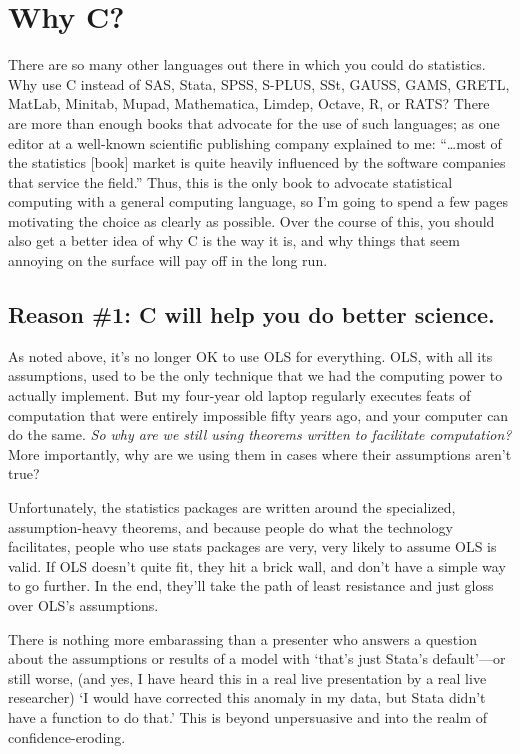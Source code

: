 \section{Why C?}

There are so many other languages out there in which you could do
statistics. Why use C instead of SAS, Stata, SPSS, S-PLUS, SSt, GAUSS, GAMS, GRETL,
MatLab, Minitab, Mupad, Mathematica, Limdep, Octave, R, or RATS? 
There are more than enough books that advocate for the use of such
languages; 
as one editor at a well-known scientific publishing company
explained to me: ``\dots most of the statistics [book] market is quite heavily
influenced by the software companies that service the
field.''  Thus, this is the only book to advocate statistical computing
with a general computing language, so I'm going to spend a few pages
motivating the choice as clearly as possible. Over the course of this, you should
also get a better idea of why C is the way it is, and why things that
seem annoying on the surface will pay off in the long run.
\ifbook
\subsection{Reason \#1: C will help you do better science.}
As noted above, it's no longer OK to use OLS for everything.
OLS, with all its assumptions, used to be the only technique that we had the computing
power to actually implement. But my four-year old laptop regularly executes
feats of computation that were entirely impossible fifty years ago, and your
computer can do the same.  {\it So why are
we still using theorems written to facilitate computation?} More importantly, why
are we using them in cases where their assumptions aren't true?

Unfortunately, the statistics packages are written around the
specialized, assumption-heavy theorems, and because people do what the
technology facilitates, people who use stats packages are very, very
likely to assume OLS is valid.  If OLS doesn't quite fit, they hit a
brick wall, and don't have a simple way to go further. In the end, they'll
take the path of least resistance and just gloss over OLS's assumptions.

There is nothing more embarassing than a presenter who answers a question
about the assumptions or results of a model with `that's just Stata's
default'---or still worse, (and yes, I have heard this in a real live
presentation by a real live researcher) `I would have corrected this
anomaly in my data, but Stata didn't have a function to do that.' This
is beyond unpersuasive and into the realm of confidence-eroding.

